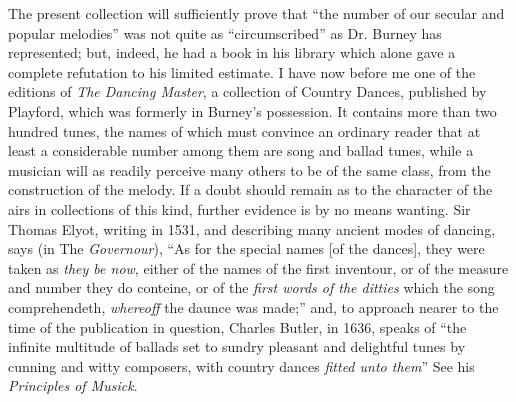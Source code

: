 The present collection will sufficiently prove that “the number of our secular
and popular melodies” was not quite as “circumscribed” as Dr. Burney has
represented; but, indeed, he had a book in his library which alone gave a complete
refutation to his limited estimate. I have now before me one of the editions
of \textit{The Dancing Master}, a collection of Country Dances, published by Playford,
which was formerly in Burney’s possession. It contains more than two hundred
tunes, the names of which must convince an ordinary reader that at least a considerable
number among them are song and ballad tunes, while a musician will as
readily perceive many others to be of the same class, from the construction of
the melody. If a doubt should remain as to the character of the airs in collections
of this kind, further evidence is by no means wanting. Sir Thomas Elyot, writing
in 1531, and describing many ancient modes of dancing, says (in The \textit{Governour}),
“As for the special names [of the dances], they were taken as \textit{they be now}, either
of the names of the first inventour, or of the measure and number they do conteine,
or of the \textit{first words of the ditties} which the song comprehendeth, \textit{whereoff}
the daunce was made;” and, to approach nearer to the time of the publication in
question, Charles Butler, in 1636, speaks of “the infinite multitude of ballads
set to sundry pleasant and delightful tunes by cunning and witty composers, with
country dances \textit{fitted unto them}” See his \textit{Principles of Musick}.

